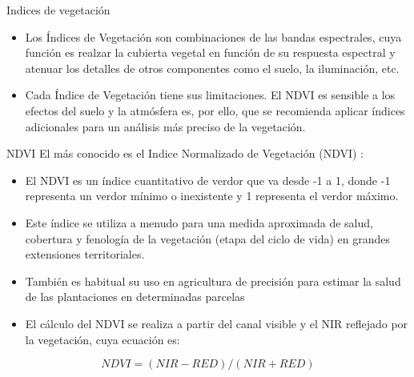 \documentclass[
  ignorenonframetext,
]{beamer}
\begin{document}
\begin{frame}{Indices de vegetación}
\protect\hypertarget{indices-de-vegetaciuxf3n}{}
\begin{itemize}
\item
  Los Índices de Vegetación son combinaciones de las bandas espectrales,
  cuya función es realzar la cubierta vegetal en función de su respuesta
  espectral y atenuar los detalles de otros componentes como el suelo,
  la iluminación, etc.
\item
  Cada Índice de Vegetación tiene sus limitaciones. El NDVI es sensible
  a los efectos del suelo y la atmósfera es, por ello, que se recomienda
  aplicar índices adicionales para un análisis más preciso de la
  vegetación.
\end{itemize}

\begin{block}{NDVI}
\protect\hypertarget{ndvi}{}
El más conocido es el Indice Normalizado de Vegetación (NDVI) :

\begin{itemize}
\item
  El NDVI es un índice cuantitativo de verdor que va desde -1 a 1, donde
  -1 representa un verdor mínimo o inexistente y 1 representa el verdor
  máximo.
\item
  Este índice se utiliza a menudo para una medida aproximada de salud,
  cobertura y fenología de la vegetación (etapa del ciclo de vida) en
  grandes extensiones territoriales.
\item
  También es habitual su uso en agricultura de precisión para estimar la
  salud de las plantaciones en determinadas parcelas
\item
  El cálculo del NDVI se realiza a partir del canal visible y el NIR
  reflejado por la vegetación, cuya ecuación es:
\end{itemize}

\[NDVI= (NIR- RED) /(NIR +RED)\]


\end{block}
\end{frame}
\end{document}
